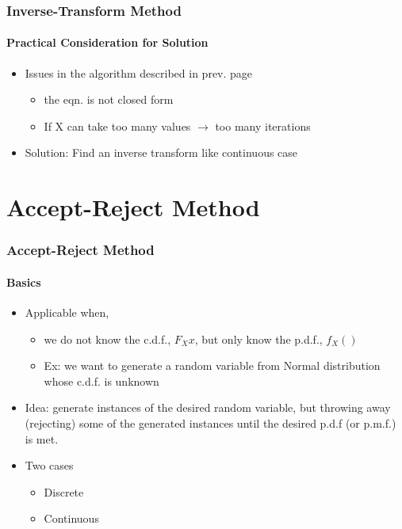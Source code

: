 \documentclass{beamer}
\begin{document}
\begin{frame}
    \frametitle{Inverse-Transform Method}
    \framesubtitle{Practical Consideration for Solution }
	\begin{itemize}
		\item Issues in the algorithm described in prev. page
		\begin{itemize}
		\item the eqn. is not closed form
		\item If X can take too many values $\rightarrow$ too many iterations
		\end{itemize}
		\item Solution: Find an inverse transform like continuous case
		  
	\end{itemize}	   
    
\end{frame}


\section{Accept-Reject Method}

\begin{frame}
    \frametitle{Accept-Reject Method}
    \framesubtitle{Basics }
	\begin{itemize}
		\item Applicable when, 
		\begin{itemize}
		\item we do not know the c.d.f., $F_X{x}$, but only know the p.d.f., 					$f_X ()$
		\item Ex: we want to generate a random variable from Normal 						distribution whose c.d.f. is unknown 

		\end{itemize}
		\item Idea: generate instances of the desired random variable, but throwing away (rejecting) some of the generated instances until the desired p.d.f (or p.m.f.) is met. 
		\item Two cases
		\begin{itemize}
		\item Discrete
		\item Continuous
		\end{itemize}
		  
	\end{itemize}	   
    
\end{frame}
\end{document}
